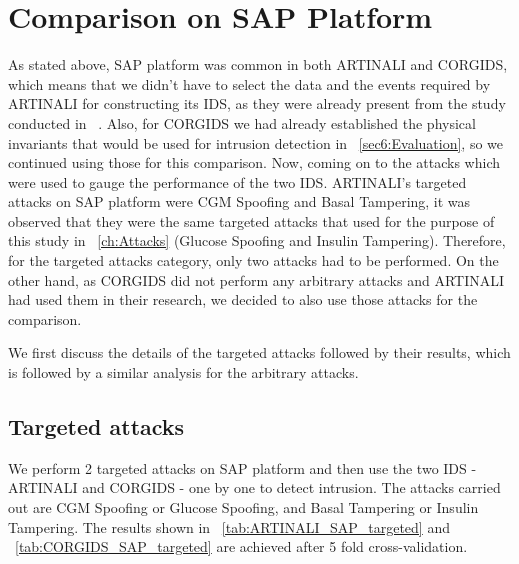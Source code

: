 \section{Comparison on \ac{SAP} Platform}
As stated above, \ac{SAP} platform was common in both ARTINALI and \ac{CORGIDS}, which means that we didn't have to select the data and the events required by ARTINALI for constructing its \ac{IDS}, as they were already present from the study conducted in ~\cite{aliabadi2017artinali}. Also, for \ac{CORGIDS} we had already established the physical invariants that would be used for intrusion detection in ~\autoref{sec6:Evaluation}, so we continued using those for this comparison. Now, coming on to the attacks which were used to gauge the performance of the two \ac{IDS}. ARTINALI's targeted attacks on \ac{SAP} platform were \ac{CGM} Spoofing and Basal Tampering, it was observed that they were the same targeted attacks that used for the purpose of this study in ~\autoref{ch:Attacks} (Glucose Spoofing and Insulin Tampering). Therefore, for the targeted attacks category, only two attacks had to be performed. On the other hand, as \ac{CORGIDS} did not perform any arbitrary attacks and ARTINALI had used them in their research, we decided to also use those attacks for the comparison.

We first discuss the details of the targeted attacks followed by their results, which is followed by a similar analysis for the arbitrary attacks.

\subsection{Targeted attacks}
We perform 2 targeted attacks on \ac{SAP} platform and then use the two \ac{IDS} - ARTINALI and \ac{CORGIDS} - one by one to detect intrusion. The attacks carried out are \ac{CGM} Spoofing or Glucose Spoofing, and Basal Tampering or Insulin Tampering. The results shown in ~\autoref{tab:ARTINALI_SAP_targeted} and ~\autoref{tab:CORGIDS_SAP_targeted} are achieved after 5 fold cross-validation.

\begin{table}
\centering
  \caption{Results of intrusion detection by ARTINALI for targeted attack on \ac{SAP} platform}
  \label{tab:ARTINALI_SAP_targeted}
\end{table}


